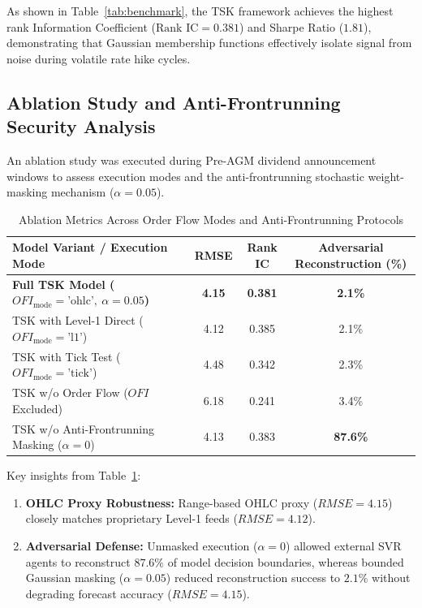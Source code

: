 \documentclass[pdflatex,sn-mathphys-num]{sn-jnl}
\theoremstyle{thmstyleone}
\theoremstyle{thmstyletwo}
\theoremstyle{thmstylethree}
\begin{document}
As shown in Table~\ref{tab:benchmark}, the TSK framework achieves the highest rank Information Coefficient ($\text{Rank IC} = 0.381$) and Sharpe Ratio ($1.81$), demonstrating that Gaussian membership functions effectively isolate signal from noise during volatile rate hike cycles.

\subsection{Ablation Study and Anti-Frontrunning Security Analysis}

An ablation study was executed during Pre-AGM dividend announcement windows to assess execution modes and the anti-frontrunning stochastic weight-masking mechanism ($\alpha = 0.05$).

\begin{table}[h!]
\centering
\caption{Ablation Metrics Across Order Flow Modes and Anti-Frontrunning Protocols}
\label{tab:ablation}
\begin{tabular}{|l|c|c|c|}
\hline
\textbf{Model Variant / Execution Mode} & \textbf{RMSE} & \textbf{Rank IC} & \textbf{Adversarial Reconstruction (\%)} \\ \hline
\textbf{Full TSK Model ($OFI_{\text{mode}} = \text{'ohlc'},\ \alpha = 0.05$)} & \textbf{4.15} & \textbf{0.381} & \textbf{2.1\%} \\ \hline
TSK with Level-1 Direct ($OFI_{\text{mode}} = \text{'l1'}$) & 4.12 & 0.385 & 2.1\% \\ \hline
TSK with Tick Test ($OFI_{\text{mode}} = \text{'tick'}$) & 4.48 & 0.342 & 2.3\% \\ \hline
TSK w/o Order Flow ($OFI$ Excluded) & 6.18 & 0.241 & 3.4\% \\ \hline
TSK w/o Anti-Frontrunning Masking ($\alpha = 0$) & 4.13 & 0.383 & \textbf{87.6\%} \\ \hline
\end{tabular}
\end{table}

Key insights from Table~\ref{tab:ablation}:
\begin{enumerate}
    \item \textbf{OHLC Proxy Robustness:} Range-based OHLC proxy ($RMSE = 4.15$) closely matches proprietary Level-1 feeds ($RMSE = 4.12$).
    \item \textbf{Adversarial Defense:} Unmasked execution ($\alpha = 0$) allowed external SVR agents to reconstruct $87.6\%$ of model decision boundaries, whereas bounded Gaussian masking ($\alpha = 0.05$) reduced reconstruction success to $2.1\%$ without degrading forecast accuracy ($RMSE = 4.15$).
\end{enumerate}
\end{document}
